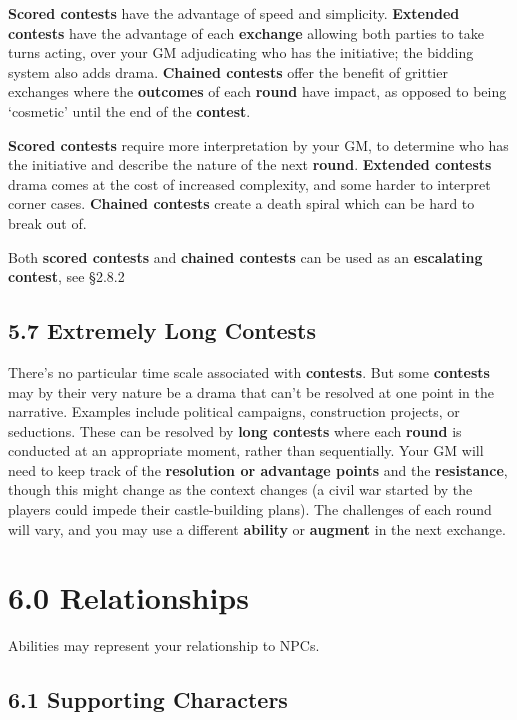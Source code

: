 \documentclass[
]{article}
\begin{document}
\textbf{Scored contests} have the advantage of speed and simplicity.
\textbf{Extended contests} have the advantage of each \textbf{exchange}
allowing both parties to take turns acting, over your GM adjudicating
who has the initiative; the bidding system also adds drama.
\textbf{Chained contests} offer the benefit of grittier exchanges where
the \textbf{outcomes} of each \textbf{round} have impact, as opposed to
being `cosmetic' until the end of the \textbf{contest}.

\textbf{Scored contests} require more interpretation by your GM, to
determine who has the initiative and describe the nature of the next
\textbf{round}. \textbf{Extended contests} drama comes at the cost of
increased complexity, and some harder to interpret corner cases.
\textbf{Chained contests} create a death spiral which can be hard to
break out of.

Both \textbf{scored contests} and \textbf{chained contests} can be used
as an \textbf{escalating contest}, see §2.8.2

\hypertarget{extremely-long-contests}{%
\subsection{5.7 Extremely Long Contests}\label{extremely-long-contests}}

There's no particular time scale associated with \textbf{contests}. But
some \textbf{contests} may by their very nature be a drama that can't be
resolved at one point in the narrative. Examples include political
campaigns, construction projects, or seductions. These can be resolved
by \textbf{long contests} where each \textbf{round} is conducted at an
appropriate moment, rather than sequentially. Your GM will need to keep
track of the \textbf{resolution or advantage points} and the
\textbf{resistance}, though this might change as the context changes (a
civil war started by the players could impede their castle-building
plans). The challenges of each round will vary, and you may use a
different \textbf{ability} or \textbf{augment} in the next exchange.

\hypertarget{relationships}{%
\section{6.0 Relationships}\label{relationships}}

Abilities may represent your relationship to NPCs.

\hypertarget{supporting-characters}{%
\subsection{6.1 Supporting Characters}\label{supporting-characters}}
\end{document}
